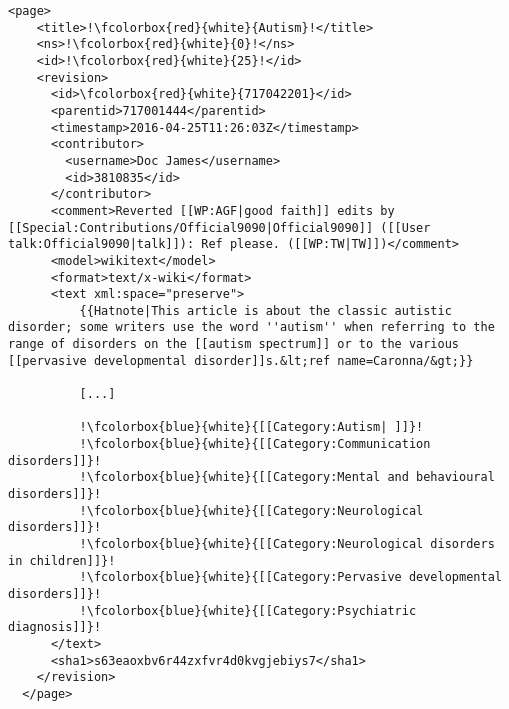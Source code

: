 
\lstset{style=codestyle, language=XML}
\begin{lstlisting}[caption= Auszug einer Artikelseite im XML Format. Rot markierte Bereiche sind durch das XML Format extrahierbar. Blau markierte Bereiche sind im Flie"stext einer Wikipedia-Seite und m"ussen mit regul"aren Ausdr"ucken extrahiert werden., label=xml-artikel]
  <page>
    <title>!\fcolorbox{red}{white}{Autism}!</title>
    <ns>!\fcolorbox{red}{white}{0}!</ns>
    <id>!\fcolorbox{red}{white}{25}!</id>
    <revision>
      <id>\fcolorbox{red}{white}{717042201}</id>
      <parentid>717001444</parentid>
      <timestamp>2016-04-25T11:26:03Z</timestamp>
      <contributor>
        <username>Doc James</username>
        <id>3810835</id>
      </contributor>
      <comment>Reverted [[WP:AGF|good faith]] edits by [[Special:Contributions/Official9090|Official9090]] ([[User talk:Official9090|talk]]): Ref please. ([[WP:TW|TW]])</comment>
      <model>wikitext</model>
      <format>text/x-wiki</format>
      <text xml:space="preserve">
          {{Hatnote|This article is about the classic autistic disorder; some writers use the word ''autism'' when referring to the range of disorders on the [[autism spectrum]] or to the various [[pervasive developmental disorder]]s.&lt;ref name=Caronna/&gt;}}
          
          [...]
          
          !\fcolorbox{blue}{white}{[[Category:Autism| ]]}!
          !\fcolorbox{blue}{white}{[[Category:Communication disorders]]}!
          !\fcolorbox{blue}{white}{[[Category:Mental and behavioural disorders]]}!
          !\fcolorbox{blue}{white}{[[Category:Neurological disorders]]}!
          !\fcolorbox{blue}{white}{[[Category:Neurological disorders in children]]}!
          !\fcolorbox{blue}{white}{[[Category:Pervasive developmental disorders]]}!
          !\fcolorbox{blue}{white}{[[Category:Psychiatric diagnosis]]}!
      </text>
      <sha1>s63eaoxbv6r44zxfvr4d0kvgjebiys7</sha1>
    </revision>
  </page>
\end{lstlisting}

